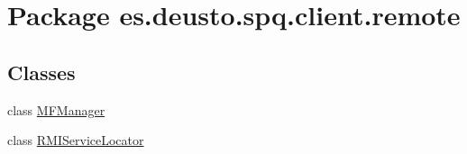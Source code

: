\hypertarget{namespacees_1_1deusto_1_1spq_1_1client_1_1remote}{}\section{Package es.\+deusto.\+spq.\+client.\+remote}
\label{namespacees_1_1deusto_1_1spq_1_1client_1_1remote}
\subsection*{Classes}
\begin{DoxyCompactItemize}
\item 
class \hyperlink{classes_1_1deusto_1_1spq_1_1client_1_1remote_1_1_m_f_manager}{M\+F\+Manager}
\item 
class \hyperlink{classes_1_1deusto_1_1spq_1_1client_1_1remote_1_1_r_m_i_service_locator}{R\+M\+I\+Service\+Locator}
\end{DoxyCompactItemize}
